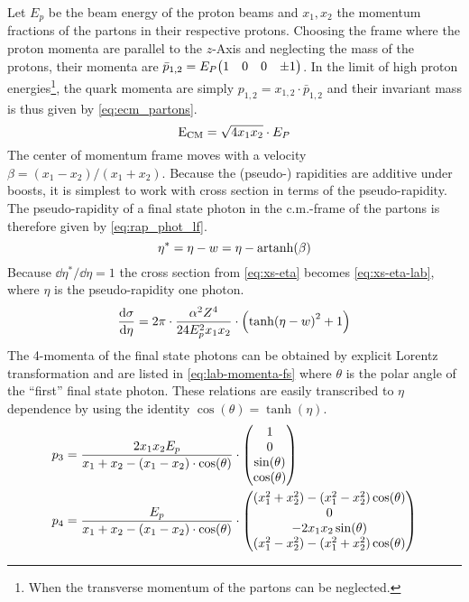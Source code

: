 Let \(E_p\) be the beam energy of the proton beams and \(x_1, x_2\)
the momentum fractions of the partons in their respective protons.
Choosing the frame where the proton momenta are parallel to the
\(z\)-Axis and neglecting the mass of the protons, their momenta are
\(\bar{p}_{1,2} = E_P \mqty(1 & 0 & 0 & \pm1)\). In the limit of high
proton energies\footnote{When the transverse momentum of the partons
  can be neglected.}, the quark momenta are simply
\(p_{1,2}=x_{1,2}\cdot\bar{p}_{1,2}\) and their invariant mass is thus
given by \cref{eq:ecm_partons}.
%
\begin{equation}
  \label{eq:ecm_partons}
  \operatorname{E_{\text{CM}}} = \sqrt{4x_1x_2}\cdot E_P
\end{equation}
%
The center of momentum frame moves with a velocity
\(\beta = (x_1-x_2)/(x_1+x_2)\). Because the (pseudo-) rapidities are
additive under boosts, it is simplest to work with cross section in
terms of the pseudo-rapidity.  The pseudo-rapidity of a final state
photon in the c.m.-frame of the partons is therefore given by
\cref{eq:rap_phot_lf}.
%
\begin{equation}
  \label{eq:rap_phot_lf}
  \eta^\ast = \eta - w = \eta - \operatorname{artanh}(\beta)
\end{equation}
%
Because \(\dd{\eta^\ast}/{\dd{\eta}} = 1\) the cross section
from \cref{eq:xs-eta} becomes \cref{eq:xs-eta-lab}, where \(\eta\) is
the pseudo-rapidity one photon.
%
\begin{equation}
  \label{eq:xs-eta-lab}
  \dv{\sigma}{\eta} = 2\pi\cdot\frac{\alpha^2Z^4}{24 E_p^2
    x_1x_2}\cdot\qty(\tanh(\eta - w)^2 + 1)
\end{equation}
%
The 4-momenta of the final state photons can be obtained by explicit
Lorentz transformation and are listed in \cref{eq:lab-momenta-fs}
where \(\theta\) is the polar angle of the ``first'' final state
photon. These relations are easily transcribed to \(\eta\) dependence
by using the identity \(\cos(\theta) = \tanh(\eta)\).
%
\begin{align}
  \label{eq:lab-momenta-fs}
  p_3 &= \frac{2x_1x_2E_p}{x_1+x_2 - (x_1 - x_2)\cdot\cos(\theta)}\cdot
  \mqty(1 \\ 0 \\ \sin(\theta) \\ \cos(\theta)) \\
  p_4 &= \frac{E_p}{x_1+x_2 - (x_1 - x_2)\cdot\cos(\theta)}\cdot
  \mqty((x_1^2+x_2^2) - (x_1^2-x_2^2)\cos(\theta) \\ 0 \\ -2x_1x_2\sin(\theta) \\ (x_1^2-x_2^2) - (x_1^2+x_2^2)\cos(\theta))
\end{align}
%
